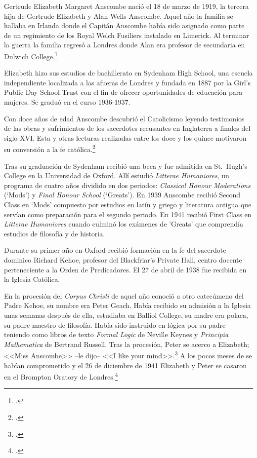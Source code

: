 Gertrude Elizabeth Margaret Anscombe nació el 18 de marzo de 1919, la tercera
hija de Gertrude Elizabeth y Alan Wells Anscombe. Aquel año la familia se
hallaba en Irlanda donde el Capitán Anscombe había sido asignado como parte de
un regimiento de los Royal Welch Fusiliers instalado en Limerick. Al terminar la
guerra la familia regresó a Londres donde Alan era profesor de secundaria en
Dulwich College.\footcite[cf.~][p.~31]{biofellows}

Elizabeth hizo sus estudios de bachillerato en Sydenham High School, una escuela
independiente localizada a las afueras de Londres y fundada en 1887 por la
Girl's Public Day School Trust con el fin de ofrecer oportunidades de educación
para mujeres. Se graduó en el curso 1936-1937.

Con doce años de edad Anscombe descubrió el Catolicismo leyendo testimonios de
las obras y sufrimientos de los sacerdotes recusantes en Inglaterra a finales
del siglo XVI. Esta y otras lecturas realizadas entre los doce y los quince
motivaron su conversión a la fe católica.\footcite[cf.~][p.~33]{biofellows}

Tras su graduación de Sydenham recibió una beca y fue admitida en St.~Hugh's
College en la Universidad de Oxford. Allí estudió \emph{Litterae Humaniores}, un
programa de cuatro años dividido en dos periodos: \emph{Classical Honour
  Moderations} (`Mods') y \emph{Final Honour School} (`Greats'). En 1939
Anscombe recibió Second Class en `Mods' compuesto por estudios en latín y griego
y literatura antigua que servían como preparación para el segundo periodo. En
1941 recibió First Class en \emph{Litterae Humaniores} cuando culminó los
exámenes de 'Greats' que comprendía estudios de filosofía y de historia.

Durante su primer año en Oxford recibió formación en la fe del sacerdote
dominico Richard Kehoe, profesor del Blackfriar's Private Hall, centro docente
perteneciente a la Orden de Predicadores. El 27 de abril de 1938 fue recibida en
la Iglesia Católica.

En la procesión del \emph{Corpus Christi} de aquel año conoció a otro catecúmeno
del Padre Kehoe, su nombre era Peter Geach. Había recibido su admisión a la
Iglesia unas semanas después de ella, estudiaba en Balliol College, su madre era
polaca, su padre maestro de filosofía. Había sido instruido en lógica por su
padre teniendo como libros de texto \emph{Formal Logic} de Neville Keynes y
\emph{Principia Mathematica} de Bertrand Russell. Tras la procesión, Peter se
acerco a Elizabeth; <<Miss Anscombe>> --le dijo-- <<I like your
mind>>.\footcite[cf.~][p.~187]{biofellowsxiv} A los pocos meses de se habían
comprometido y el 26 de diciembre de 1941 Elizabeth y Peter se casaron en el
Brompton Oratory de Londres.\footcite[cf.~][p.~33]{biofellows}

